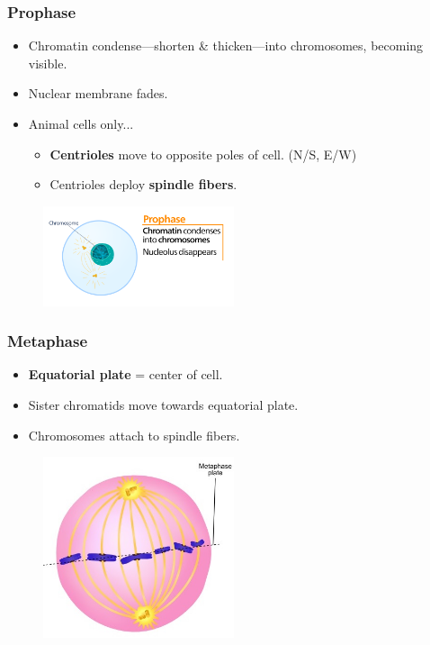 \documentclass[a4paper,12pt]{article}
\begin{document}
\subsubsection{Prophase}
\begin{itemize}
    \item{Chromatin condense---shorten \& thicken---into chromosomes, becoming visible.}
    \item{Nuclear membrane fades.}
    \item{
            Animal cells only...
            \begin{itemize}
                \item{\textbf{Centrioles} move to opposite poles of cell. (N/S, E/W)}
                \item{Centrioles deploy \textbf{spindle fibers}.}
            \end{itemize}
        }
\end{itemize}

\begin{figure}[H]
    \centering
    \includegraphics[width=0.5\textwidth]{prophase}
\end{figure}

\subsubsection{Metaphase}
\begin{itemize}
    \item{\textbf{Equatorial plate} = center of cell.}
    \item{Sister chromatids move towards equatorial plate.}
    \item{Chromosomes attach to spindle fibers.}
\end{itemize}

\begin{figure}[H]
    \centering
    \includegraphics[width=0.5\textwidth]{metaphase}
\end{figure}
\end{document}
